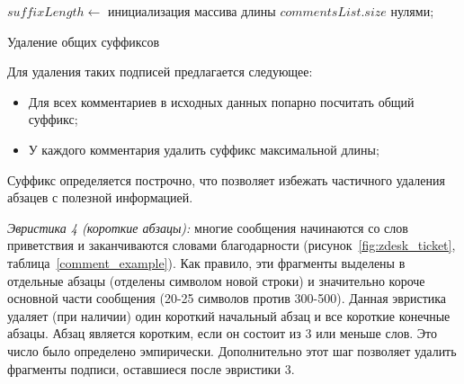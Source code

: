 \vspace{\baselineskip}
\begin{algorithm}[H]
		\SetAlgoLined
		$suffixLength \leftarrow$ инициализация массива длины $commentsList.size$ нулями;\\
		

	\caption{Удаление общих суффиксов}
	\label{algo1}
\end{algorithm}
\vspace{\baselineskip}

Для удаления таких подписей предлагается следующее:

 \begin{itemize}
\item Для всех комментариев в исходных данных попарно посчитать общий суффикс;
\item У каждого комментария удалить суффикс максимальной длины;
\end{itemize}

Суффикс определяется построчно, что позволяет избежать частичного удаления абзацев с полезной информацией.

\textit{Эвристика 4 (короткие абзацы):} многие сообщения начинаются со слов приветствия и заканчиваются словами благодарности (рисунок~\ref{fig:zdesk_ticket}, таблица~\ref{comment_example}). Как правило, эти фрагменты выделены в отдельные абзацы (отделены символом новой строки) и значительно короче основной части сообщения (20-25 символов против 300-500). Данная эвристика удаляет (при наличии) один короткий начальный абзац и все короткие конечные абзацы. Абзац является коротким, если он состоит из 3 или меньше слов. Это число было определено эмпирически. Дополнительно этот шаг позволяет удалить фрагменты подписи, оставшиеся после эвристики 3.

